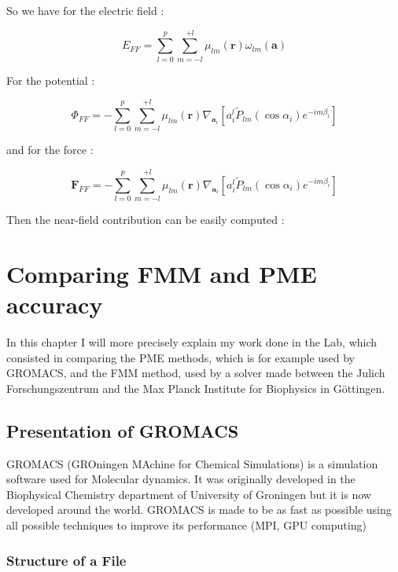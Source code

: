 \documentclass[11pt,twoside,a4paper]{report}
\begin{document}
   
   So we have for the electric field :
      
   \begin{equation}
   E_{FF} = \sum\limits_{l=0}^{p} \sum\limits_{m=-l}^{+l} \mu_{lm}(\textbf{r}) \omega_{lm}(\textbf{a})
   \end{equation}
   
   For the potential :
 
 	\begin{equation}
   \Phi_{FF} = - \sum\limits_{l=0}^{p} \sum\limits_{m=-l}^{+l} \mu_{lm}(\textbf{r}) \nabla_{\textbf{a}_i}[a_i^l \widetilde{P}_{lm}(\cos\alpha_i)e^{-im\beta_i}]
   \end{equation}
   
   and for the force :
   
   \begin{equation}
   \textbf{F}_{FF} = - \sum\limits_{l=0}^{p} \sum\limits_{m=-l}^{+l} \mu_{lm}(\textbf{r}) \nabla_{\textbf{a}_i}[a_i^l \widetilde{P}_{lm}(\cos\alpha_i)e^{-im\beta_i}]
   \end{equation}
   
 Then the near-field contribution can be easily computed : 

 

\chapter{Comparing FMM and PME accuracy}

    In this chapter I will more precisely explain my work done in the Lab, which consisted in comparing the PME methods, which is for example used by GROMACS, and the FMM method, used by a solver made between the Julich Forschungszentrum and the Max Planck Institute for Biophysics in Göttingen.

  


\section{Presentation of GROMACS}

    GROMACS (GROningen MAchine for Chemical Simulations) is a simulation software used for Molecular dynamics. It was originally developed in the Biophysical Chemistry department of University of Groningen but it is now developed around the world. GROMACS is made to be as fast as possible using all possible techniques to improve its performance (MPI, GPU computing) 
    
   
	\subsection{Structure of a File}
	
\end{document}
